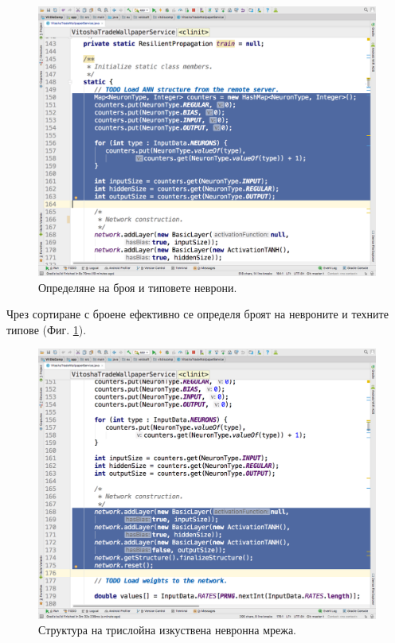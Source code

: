 \documentclass[book,14pt,oneside,openany]{memoir}
\begin{document}
\begin{figure}[h]
  \centering
  \includegraphics[height=0.45\pdfpageheight]{./images/pic0036.png}
  \caption{Определяне на броя и типовете неврони.}
\label{fig:pic0036}
\end{figure}
\FloatBarrier

Чрез сортиране с броене ефективно се определя броят на невроните и техните типове (Фиг. \ref{fig:pic0036}).

\begin{figure}[h]
  \centering
  \includegraphics[height=0.45\pdfpageheight]{./images/pic0037.png}
  \caption{Структура на трислойна изкуствена невронна мрежа.}
\label{fig:pic0037}
\end{figure}
\FloatBarrier
\end{document}
